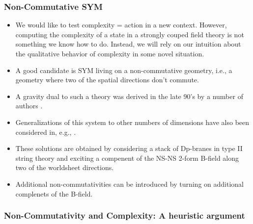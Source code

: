 \documentclass[10pt]{beamer}
\begin{document}
\begin{frame}
\frametitle{Non-Commutative SYM}

\begin{itemize}

\item We would like to test complexity = action in a new context. However, computing the complexity of a state in a strongly couped field theory is not something we know how to do. Instead, we will rely on our intuition about the qualitative behavior of complexity in some novel situation.

\item A good candidate is SYM living on a non-commutative geometry, i.e., a geometry where two of the spatial directions don't commute.

\item A gravity dual to such a theory was derived in the late 90's by a number of authors \cite{Hashimoto:1999ut, Maldacena:1999mh}.

\item Generalizations of this system to other numbers of dimensions have also been considered in, e.g., \cite{Alishahiha:1999ci, Berman:2000jw}.

\item These solutions are obtained by considering a stack of Dp-branes in type II string theory and exciting a compenent of the NS-NS 2-form B-field along two of the worldsheet directions.

\item Additional non-commutativities can be introduced by turning on additional complenets of the B-field.

\end{itemize}

\end{frame}\begin{frame}
\frametitle{Non-Commutativity and Complexity: A heuristic argument}


\end{frame}
\end{document}
